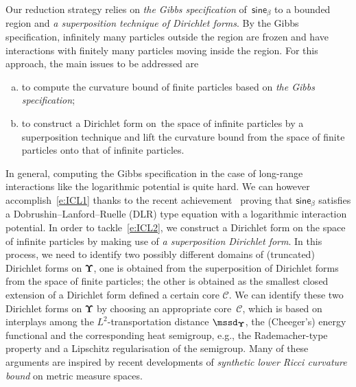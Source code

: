 \documentclass[11pt,letterpaper]{amsart}
\newcommand{\dUpsilon}{{\mathbf \Upsilon}}
\newcommand{\U}{\dUpsilon}
\newcommand{\sine}{\mathsf{sine}}
\renewcommand{\1}{\mathbf 1}
\numberwithin{equation}{section}
\theoremstyle{plain}
\theoremstyle{definition}
\theoremstyle{remark}
\begin{document}
Our reduction strategy relies on {\it the Gibbs specification} of~$\sine_\beta$ to a bounded region and {\it a superposition technique of Dirichlet forms}.
By the Gibbs specification,  infinitely many particles outside the region are frozen and have interactions with finitely many particles moving inside the region. 
For this approach, the main issues to be addressed are 
\begin{enumerate}[(a)]
\item\label{e:ICL1} to compute the curvature bound of finite particles based on {\it the Gibbs specification}; %
\item\label{e:ICL2} to construct a Dirichlet form on~the space of infinite particles by a superposition technique and lift the curvature bound from the space of finite particles onto that of infinite particles.
\end{enumerate}
In general, computing the Gibbs specification in the case of long-range interactions like the logarithmic potential is quite hard. We can however accomplish~\ref{e:ICL1} thanks to the recent achievement~\cite{DerHarLebMai20} proving that $\sine_\beta$ satisfies a Dobrushin--Lanford--Ruelle (DLR) type equation with a logarithmic interaction potential.  In order to tackle~\ref{e:ICL2}, we construct a Dirichlet form on the space of infinite particles by making use of {\it a superposition Dirichlet form}.  In this process, we need to identify two possibly different domains of (truncated) Dirichlet forms on $\U$, one is obtained from the superposition of Dirichlet forms from the space of finite particles; the other is obtained as the smallest closed extension of a Dirichlet form defined a certain core $\mathcal C$. We can identify these two Dirichlet forms on $\U$ by choosing an appropriate core~$\mathcal C$, which is based on interplays among the $L^2$-transportation distance $\mssd_\U$, the (Cheeger's) energy functional and the corresponding heat semigroup, e.g., the Rademacher-type property and a Lipschitz regularisation of the semigroup.  Many of these arguments are inspired by recent developments of {\it synthetic lower Ricci curvature bound} on metric measure spaces. 
\end{document}
